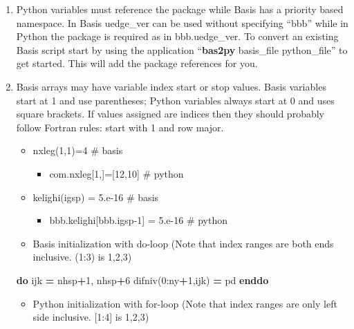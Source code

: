 \documentclass[11pt]{article}
\providecommand{\tightlist}{%
      \setlength{\itemsep}{0pt}\setlength{\parskip}{0pt}}
\newenvironment{Shaded}{}{}
\newcommand{\KeywordTok}[1]{\textcolor[rgb]{0.00,0.44,0.13}{\textbf{{#1}}}}
\newcommand{\DecValTok}[1]{\textcolor[rgb]{0.25,0.63,0.44}{{#1}}}
\newcommand{\NormalTok}[1]{{#1}}
\begin{document}
\begin{enumerate}
\def\labelenumi{\arabic{enumi}.}
\tightlist
\item
  Python variables must reference the package while Basis has a priority
  based namespace. In Basis uedge\_ver can be used without specifying
  ``bbb'' while in Python the package is required as in bbb.uedge\_ver.
  To convert an existing Basis script start by using the application
  ``\textbf{bas2py} basis\_file python\_file'' to get started. This will
  add the package references for you.
\item
  Basis arrays may have variable index start or stop values. Basis
  variables start at 1 and use parentheses; Python variables always
  start at 0 and uses square brackets. If values assigned are indices
  then they should probably follow Fortran rules: start with 1 and row
  major.

  \begin{itemize}
  \tightlist
  \item
    nxleg(1,1)=4 \# basis

    \begin{itemize}
    \tightlist
    \item
      com.nxleg{[}1,{]}={[}12,10{]} \# python
    \end{itemize}
  \item
    kelighi(igsp) = 5.e-16 \# basis

    \begin{itemize}
    \tightlist
    \item
      bbb.kelighi{[}bbb.igsp-1{]} = 5.e-16 \# python
    \end{itemize}
  \item
    Basis initialization with do-loop (Note that index ranges are both
    ends inclusive. (1:3) is 1,2,3)
  \end{itemize}

\begin{Shaded}
\begin{Highlighting}[]
  \KeywordTok{do}\NormalTok{ ijk }\KeywordTok{=}\NormalTok{ nhsp}\KeywordTok{+}\DecValTok{1}\NormalTok{, nhsp}\KeywordTok{+}\DecValTok{6}
\NormalTok{   difniv(}\DecValTok{0}\NormalTok{:ny}\KeywordTok{+}\DecValTok{1}\NormalTok{,ijk) }\KeywordTok{=}\NormalTok{ pd}
  \KeywordTok{enddo} 
\end{Highlighting}
\end{Shaded}

  \begin{itemize}
  \tightlist
  \item
    Python initialization with for-loop (Note that index ranges are only
    left side inclusive. {[}1:4{]} is 1,2,3)
  \end{itemize}


\end{enumerate}
\end{document}
